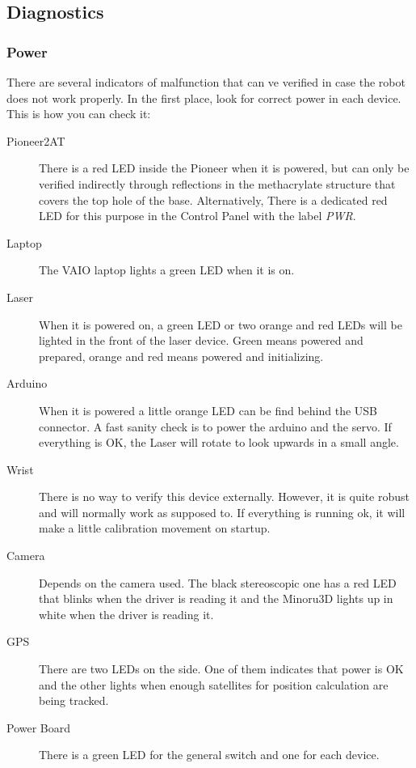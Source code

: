 \subsection{Diagnostics}

\subsubsection{Power}
There are several indicators of malfunction that can ve verified in case the robot does not work properly.
In the first place, look for correct power in each device. This is how you can check it:
\begin{description}
 \item[Pioneer2AT] There is a red LED inside the Pioneer when it is powered, but can only be verified
indirectly through reflections in the methacrylate structure that covers the top hole of the base.
Alternatively, There is a dedicated red LED for this purpose in the Control Panel with the label \textit{PWR}.
\item[Laptop] The VAIO laptop lights a green LED when it is on.
\item[Laser] When it is powered on, a green LED or two orange and red LEDs will be lighted in the front of the
laser device. Green means powered and prepared, orange and red means powered and initializing.
\item[Arduino] When it is powered a little orange LED can be find behind the USB connector. A fast sanity check
is to power the arduino and the servo. If everything is OK, the Laser will rotate to look upwards in a small angle.
\item[Wrist] There is no way to verify this device externally. However, it is quite robust and will normally work
as supposed to. If everything is running ok, it will make a little calibration
movement on startup.
\item[Camera] Depends on the camera used. The black stereoscopic one has a red LED that blinks when the driver is
reading it and the Minoru3D lights up in white when the driver is reading it.
\item[GPS] There are two LEDs on the side. One of them indicates that power is OK and the other lights when enough satellites for position calculation are being tracked.
\item[Power Board] There is a green LED for the general switch and one for each device.
 \end{description}




